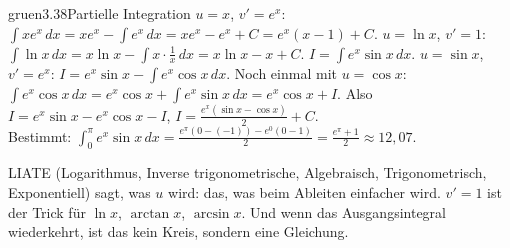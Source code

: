 \begin{loesungkarte}{gruen}{3.38}{Partielle Integration}
$u = x$, $v' = e^{x}$: $\int xe^{x}\,dx = xe^{x} - \int e^{x}\,dx = xe^{x} - e^{x} + C = e^{x}(x - 1) + C$.
$u = \ln x$, $v' = 1$: $\int\ln x\,dx = x\ln x - \int x\cdot\frac1x\,dx = x\ln x - x + C$.
$I = \int e^{x}\sin x\,dx$. $u = \sin x$, $v' = e^{x}$: $I = e^{x}\sin x - \int e^{x}\cos x\,dx$. Noch einmal mit $u = \cos x$: $\int e^{x}\cos x\,dx = e^{x}\cos x + \int e^{x}\sin x\,dx = e^{x}\cos x + I$. Also $I = e^{x}\sin x - e^{x}\cos x - I$, $I = \frac{e^{x}(\sin x - \cos x)}2 + C$. \\
Bestimmt: $\int_0^{\pi}e^{x}\sin x\,dx = \frac{e^{\pi}(0 - (-1)) - e^{0}(0 - 1)}2 = \frac{e^{\pi} + 1}2\approx12{,}07$.
\begin{mitnehmen}\kastentext
LIATE (Logarithmus, Inverse trigonometrische, Algebraisch, Trigonometrisch, Exponentiell) sagt, was $u$ wird: das, was beim Ableiten einfacher wird. $v' = 1$ ist der Trick für $\ln x$, $\arctan x$, $\arcsin x$. Und wenn das Ausgangsintegral wiederkehrt, ist das kein Kreis, sondern eine Gleichung.
\end{mitnehmen}
\end{loesungkarte}

